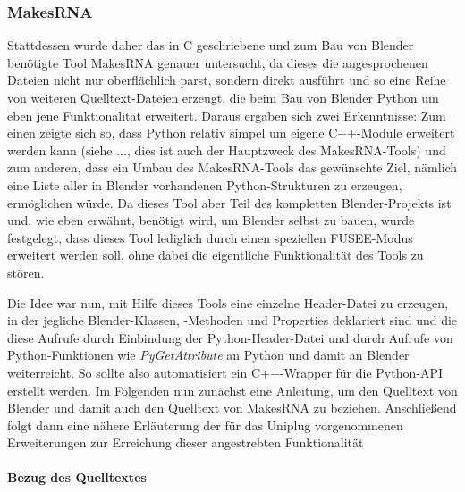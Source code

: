 \subsubsection{MakesRNA}

Stattdessen wurde daher das in C geschriebene und zum Bau von Blender benötigte Tool MakesRNA genauer untersucht, da dieses die angesprochenen Dateien nicht nur oberflächlich parst, sondern direkt ausführt und so eine Reihe von weiteren Quelltext-Dateien erzeugt, die beim Bau von Blender Python um eben jene Funktionalität erweitert. Daraus ergaben sich zwei Erkenntnisse: Zum einen zeigte sich so, dass Python relativ simpel um eigene C++-Module erweitert werden kann (siehe ..., dies ist auch der Hauptzweck des MakesRNA-Tools) und zum anderen, dass ein Umbau des MakesRNA-Tools das gewünschte Ziel, nämlich eine Liste aller in Blender vorhandenen Python-Strukturen zu erzeugen, ermöglichen würde. Da dieses Tool aber Teil des kompletten Blender-Projekts ist und, wie eben erwähnt, benötigt wird, um Blender selbst zu bauen, wurde festgelegt, dass dieses Tool lediglich durch einen speziellen FUSEE-Modus erweitert werden soll, ohne dabei die eigentliche Funktionalität des Tools zu stören.

Die Idee war nun, mit Hilfe dieses Tools eine einzelne Header-Datei zu erzeugen, in der jegliche Blender-Klassen, -Methoden und Properties deklariert sind und die diese Aufrufe durch Einbindung der Python-Header-Datei und durch Aufrufe von Python-Funktionen wie \emph{PyGetAttribute} an Python und damit an Blender weiterreicht. So sollte also automatisiert ein C++-Wrapper für die Python-API erstellt werden. Im Folgenden nun zunächst eine Anleitung, um den Quelltext von Blender und damit auch den Quelltext von MakesRNA zu beziehen. Anschließend folgt dann eine nähere Erläuterung der für das Uniplug vorgenommenen Erweiterungen zur Erreichung dieser angestrebten Funktionalität

\paragraph{Bezug des Quelltextes}

